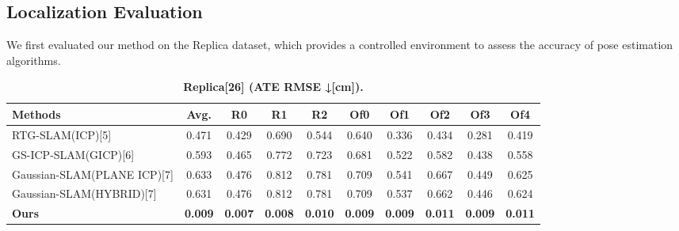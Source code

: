 \documentclass[twocolumn]{article} %
\begin{document}
\subsection{Localization Evaluation}\label{localization-evaluation}

We first evaluated our method on the Replica dataset, which provides a
controlled environment to assess the accuracy of pose estimation
algorithms.

\begin{table}[htbp]
\renewcommand{\thetable}{\textbf{\arabic{table}}}
\renewcommand{\tablename}{\textbf{Table}}
\centering
\caption{\textbf{Replica[26] (ATE RMSE ↓[cm]).}}
\label{table:_textbf_replica_26_a}
\begin{adjustbox}{max width=\columnwidth,max height=!,center}
\begin{tabular}{lccccccccc}
\toprule
\textbf{Methods} & \textbf{Avg.} & \textbf{R0} & \textbf{R1} & \textbf{R2} & \textbf{Of0} & \textbf{Of1} & \textbf{Of2} & \textbf{Of3} & \textbf{Of4}\\
\midrule
RTG-SLAM(ICP)[5] & \cellcolor{yellow!30}0.471 & \cellcolor{yellow!30}0.429 & \cellcolor{yellow!30}0.690 & \cellcolor{yellow!30}0.544 & \cellcolor{yellow!30}0.640 & \cellcolor{yellow!30}0.336 & \cellcolor{yellow!30}0.434 & \cellcolor{yellow!30}0.281 & \cellcolor{yellow!30}0.419\\
GS-ICP-SLAM(GICP)[6] & \cellcolor{lime!50}0.593 & \cellcolor{lime!50}0.465 & \cellcolor{lime!50}0.772 & \cellcolor{lime!50}0.723 & \cellcolor{lime!50}0.681 & \cellcolor{lime!50}0.522 & \cellcolor{lime!50}0.582 & \cellcolor{lime!50}0.438 & \cellcolor{lime!50}0.558\\
Gaussian-SLAM(PLANE ICP)[7] & 0.633 & 0.476 & 0.812 & 0.781 & 0.709 & 0.541 & 0.667 & 0.449 & 0.625\\
Gaussian-SLAM(HYBRID)[7] & 0.631 & 0.476 & 0.812 & 0.781 & 0.709 & 0.537 & 0.662 & 0.446 & 0.624\\
\midrule
\textbf{Ours} & \cellcolor{green!30}\textbf{0.009} & \cellcolor{green!30}\textbf{0.007} & \cellcolor{green!30}\textbf{0.008} & \cellcolor{green!30}\textbf{0.010} & \cellcolor{green!30}\textbf{0.009} & \cellcolor{green!30}\textbf{0.009} & \cellcolor{green!30}\textbf{0.011} & \cellcolor{green!30}\textbf{0.009} & \cellcolor{green!30}\textbf{0.011}\\
\bottomrule
\end{tabular}
\end{adjustbox}
\end{table}
\end{document}
